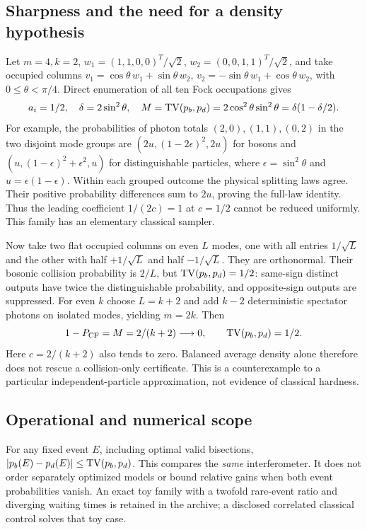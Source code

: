 \subsection{Sharpness and the need for a density hypothesis}
Let $m=4,k=2$, $w_1=(1,1,0,0)^T/\sqrt2$, $w_2=(0,0,1,1)^T/\sqrt2$, and take occupied columns $v_1=\cos\theta\,w_1+\sin\theta\,w_2$, $v_2=-\sin\theta\,w_1+\cos\theta\,w_2$, with $0\le\theta<\pi/4$. Direct enumeration of all ten Fock occupations gives
\begin{equation}
 a_i=1/2,\quad\delta=2\sin^2\theta,\quad
 M=\operatorname{TV}(p_b,p_d)=2\cos^2\theta\sin^2\theta
 =\delta(1-\delta/2).\label{eq:sharp}
\end{equation}
For example, the probabilities of photon totals $(2,0),(1,1),(0,2)$ in the two disjoint mode groups are $(2u,(1-2\epsilon)^2,2u)$ for bosons and $(u,(1-\epsilon)^2+\epsilon^2,u)$ for distinguishable particles, where $\epsilon=\sin^2\theta$ and $u=\epsilon(1-\epsilon)$. Within each grouped outcome the physical splitting laws agree. Their positive probability differences sum to $2u$, proving the full-law identity. Thus the leading coefficient $1/(2c)=1$ at $c=1/2$ cannot be reduced uniformly. This family has an elementary classical sampler.

Now take two flat occupied columns on even $L$ modes, one with all entries $1/\sqrt L$ and the other with half $+1/\sqrt L$ and half $-1/\sqrt L$. They are orthonormal. Their bosonic collision probability is $2/L$, but $\operatorname{TV}(p_b,p_d)=1/2$: same-sign distinct outputs have twice the distinguishable probability, and opposite-sign outputs are suppressed. For even $k$ choose $L=k+2$ and add $k-2$ deterministic spectator photons on isolated modes, yielding $m=2k$. Then
\begin{equation}
 1-P_{\mathrm{CF}}=M=2/(k+2)\longrightarrow0,\qquad
 \operatorname{TV}(p_b,p_d)=1/2.\label{eq:spectator}
\end{equation}
Here $c=2/(k+2)$ also tends to zero. Balanced average density alone therefore does not rescue a collision-only certificate. This is a counterexample to a particular independent-particle approximation, not evidence of classical hardness.

\subsection{Operational and numerical scope}
For any fixed event $E$, including optimal valid bisections, $|p_b(E)-p_d(E)|\le\operatorname{TV}(p_b,p_d)$. This compares the \emph{same} interferometer. It does not order separately optimized models or bound relative gains when both event probabilities vanish. An exact toy family with a twofold rare-event ratio and diverging waiting times is retained in the archive; a disclosed correlated classical control solves that toy case.

